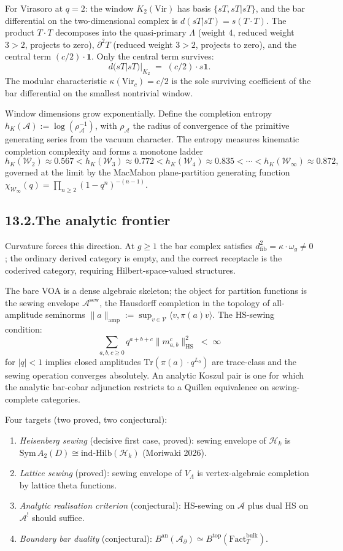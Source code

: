 \documentclass[11pt,reqno]{amsart}
\theoremstyle{definition}
\theoremstyle{remark}
\providecommand{\cA}{\mathcal{A}}
\providecommand{\cH}{\mathcal{H}}
\providecommand{\cV}{\mathcal{V}}
\providecommand{\cW}{\mathcal{W}}
\providecommand{\Sym}{\mathrm{Sym}}
\providecommand{\Vir}{\mathrm{Vir}}
\providecommand{\Tr}{\mathrm{Tr}}
\numberwithin{equation}{section}
\begin{document}
For Virasoro at $q = 2$: the window $K_2(\Vir)$ has basis
$\{sT, sT|sT\}$, and the bar differential on the two-dimensional
complex is $d(sT|sT) = s(T\cdot T)$. The product $T\cdot T$
decomposes into the quasi-primary $\Lambda$ (weight $4$,
reduced weight $3 > 2$, projects to zero), $\partial^2 T$
(reduced weight $3 > 2$, projects to zero), and the central
term $(c/2)\cdot\mathbf 1$. Only the central term survives:
\[
d(sT|sT)|_{K_2} \;=\; (c/2)\cdot s\mathbf 1.
\]
The modular characteristic $\kappa(\Vir_c) = c/2$ is the sole
surviving coefficient of the bar differential on the smallest
nontrivial window.

Window dimensions grow exponentially. Define the completion
entropy $h_K(\cA) := \log(\rho_\cA^{-1})$, with $\rho_\cA$ the
radius of convergence of the primitive generating series from
the vacuum character. The entropy measures kinematic
completion complexity and forms a monotone ladder
\[
h_K(\cW_2) \approx 0.567
< h_K(\cW_3) \approx 0.772
< h_K(\cW_4) \approx 0.835
< \cdots
< h_K(\cW_\infty) \approx 0.872,
\]
governed at the limit by the MacMahon plane-partition
generating function
$\chi_{\cW_\infty}(q) = \prod_{n \ge 2}(1 - q^n)^{-(n-1)}$.

\subsection*{13.2.\enspace The analytic frontier}

Curvature forces this direction. At $g \ge 1$ the bar complex
satisfies $d_{\mathrm{fib}}^2 = \kappa\cdot\omega_g \neq 0$;
the ordinary derived category is empty, and the correct
receptacle is the coderived category, requiring
Hilbert-space-valued structures.

The bare VOA is a dense algebraic skeleton; the object for
partition functions is the sewing envelope $\cA^{\mathrm{sew}}$,
the Hausdorff completion in the topology of all-amplitude
seminorms $\|a\|_{\mathrm{amp}} := \sup_{v \in \cV}
\langle v, \pi(a) v\rangle$. The HS-sewing condition:
\[
\sum_{a,b,c \ge 0} q^{a+b+c}\|m^c_{a,b}\|^2_{\mathrm{HS}}
\;<\;\infty
\]
for $|q| < 1$ implies closed amplitudes
$\Tr(\pi(a)\cdot q^{L_0})$ are trace-class and the sewing
operation converges absolutely. An analytic Koszul pair is
one for which the analytic bar-cobar adjunction restricts to a
Quillen equivalence on sewing-complete categories.

Four targets (two proved, two conjectural):
\begin{enumerate}[label=(\alph*),nosep]
\item \emph{Heisenberg sewing} (decisive first case, proved):
sewing envelope of $\cH_k$ is
$\Sym\,A_2(D) \cong \mathrm{ind\text{-}Hilb}(\cH_k)$
(Moriwaki 2026).
\item \emph{Lattice sewing} (proved): sewing envelope of
$V_\Lambda$ is vertex-algebraic completion by lattice theta
functions.
\item \emph{Analytic realisation criterion} (conjectural):
HS-sewing on $\cA$ plus dual HS on $\cA^!$ should suffice.
\item \emph{Boundary bar duality} (conjectural):
$B^{\mathrm{an}}(\cA_\partial) \simeq
B^{\mathrm{top}}(\mathrm{Fact}^{\mathrm{bulk}}_T)$.
\end{enumerate}
\end{document}
